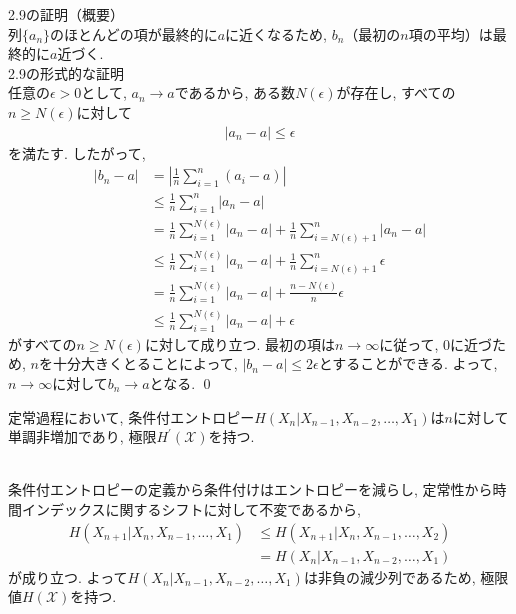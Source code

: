 \documentclass[a4j]{jsarticle}
\begin{document}
 2.9の証明（概要）\\

列$\{a_n\}$のほとんどの項が最終的に$a$に近くなるため, $b_n$（最初の$n$項の平均）は最終的に$a$近づく.\\

 2.9の形式的な証明\\

任意の$\epsilon > 0$として, $a_n \rightarrow a$であるから, ある数$N(\epsilon)$が存在し, すべての$n \geq  N(\epsilon)$に対して\begin{align}
	|a_n - a| \leq \epsilon
\end{align}
を満たす.
したがって,
\begin{align}
	|b_n - a| & = |\frac{1}{n} \sum_{i=1}^{n} (a_i -a)|                                                             \\
	          & \leq \frac{1}{n} \sum_{i=1}^{n} |a_n -a|                                                            \\
	          & = \frac{1}{n} \sum_{i=1}^{N(\epsilon)} |a_n -a| + \frac{1}{n} \sum_{i=N(\epsilon)+1}^{n} |a_n -a|   \\
	          & \leq\frac{1}{n} \sum_{i=1}^{N(\epsilon)} |a_n -a| + \frac{1}{n} \sum_{i=N(\epsilon)+1}^{n} \epsilon \\
	          & = \frac{1}{n} \sum_{i=1}^{N(\epsilon)} |a_n -a| + \frac{n - N(\epsilon)}{n} \epsilon                \\
	          & \leq \frac{1}{n} \sum_{i=1}^{N(\epsilon)} |a_n -a| + \epsilon
\end{align}
がすべての$n \geq  N(\epsilon)$に対して成り立つ. 最初の項は$n \rightarrow \infty$に従って, 0に近づため, $n$を十分大きくとることによって, $|b_n - a| \leq 2\epsilon$とすることができる. よって, $n \rightarrow \infty$に対して$b_n \rightarrow a$となる. \qed\\

\begin{itembox}[l]{}
	定常過程において, 条件付エントロピー$H(X_n | X_{n-1}, X_{n-2}, \ldots, X_1)$は$n$に対して単調非増加であり, 極限$H^\prime(\mathcal{X})$を持つ.
\end{itembox}\\

 条件付エントロピーの定義から条件付けはエントロピーを減らし, 定常性から時間インデックスに関するシフトに対して不変であるから,
\begin{align}
	H(X_{n+1} | X_n, X_{n-1}, \ldots, X_1)
	 & \leq H(X_{n+1} | X_n, X_{n-1}, \ldots, X_2) \\
	 & = H(X_n | X_{n-1}, X_{n-2}, \ldots, X_1)
\end{align}
が成り立つ. よって$H(X_n | X_{n-1}, X_{n-2}, \ldots, X_1)$は非負の減少列であるため, 極限値$H(\mathcal{X})$を持つ.\\
\end{document}

